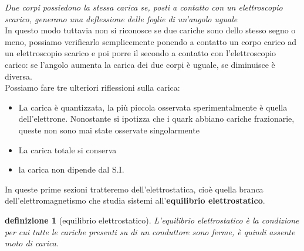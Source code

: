 \documentclass[10pt,a4paper]{article}
\newtheorem{definizione}{definizione}
\begin{document}
\textit{Due corpi possiedono la stessa carica se, posti a contatto con un elettroscopio scarico, generano una deflessione delle foglie di un'angolo uguale}\\
In questo modo tuttavia non si riconosce se due cariche sono dello stesso segno o meno, possiamo verificarlo semplicemente ponendo a contatto un corpo carico ad un elettroscopio scarico e poi porre il secondo a contatto con l'elettroscopio carico: se l'angolo aumenta la carica dei due corpi è uguale, se diminuisce è diversa.\\
Possiamo fare tre ulteriori riflessioni sulla carica:
\begin{itemize}
	\item La carica è quantizzata, la più piccola osservata sperimentalmente è quella dell'elettrone. Nonostante si ipotizza che i quark abbiano cariche frazionarie, queste non sono mai state osservate singolarmente
	\item La carica totale si conserva
	\item la carica non dipende dal S.I.
\end{itemize}
In queste prime sezioni tratteremo dell'elettrostatica, cioè quella branca dell'elettromagnetismo che studia sistemi all'\textbf{equilibrio elettrostatico}.
\begin{definizione}[equilibrio elettrostatico]
	L'equilibrio elettrostatico è la condizione per cui tutte le cariche presenti su di un conduttore sono ferme, è quindi assente moto di carica.
\end{definizione}
\end{document}

